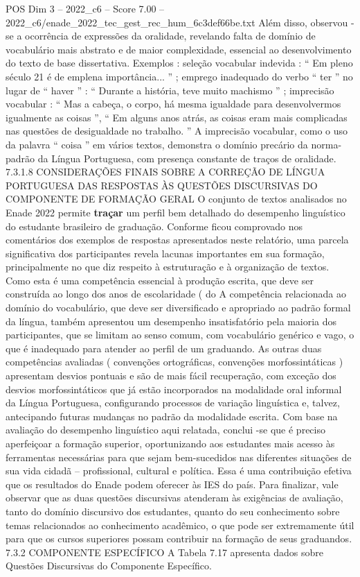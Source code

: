 \begin{textsample}{POS Dim 3 – 2022\_c6 – Score 7.00 – 2022\_c6/enade\_2022\_tec\_gest\_rec\_hum\_6c3def66be.txt}
Além disso, observou -se a ocorrência de expressões da oralidade, revelando falta de domínio de vocabulário mais abstrato e de maior complexidade, essencial ao desenvolvimento do texto de base dissertativa.
Exemplos : seleção vocabular indevida : “ Em pleno século 21 é de emplena importância... ” ; emprego inadequado do verbo “ ter ” no lugar de “ haver ” : “ Durante a história, teve muito machismo ” ; imprecisão vocabular : “ Mas a cabeça, o corpo, há mesma igualdade para desenvolvermos igualmente as coisas ”, “ Em alguns anos atrás, as coisas eram mais complicadas nas questões de desigualdade no trabalho. ” A imprecisão vocabular, como o uso da palavra “ coisa ” em vários textos, demonstra o domínio precário da norma-padrão da Língua Portuguesa, com presença constante de traços de oralidade. 7.3.1.8 CONSIDERAÇÕES FINAIS SOBRE A CORREÇÃO DE LÍNGUA PORTUGUESA DAS RESPOSTAS ÀS QUESTÕES DISCURSIVAS DO COMPONENTE DE FORMAÇÃO GERAL O conjunto de textos analisados no Enade 2022 permite \textbf{traçar} um perfil bem detalhado do desempenho linguístico do estudante brasileiro de graduação.
Conforme ficou comprovado nos comentários dos exemplos de respostas apresentados neste relatório, uma parcela significativa dos participantes revela lacunas importantes em sua formação, principalmente no que diz respeito à estruturação e à organização de textos.
Como esta é uma competência essencial à produção escrita, que deve ser construída ao longo dos anos de escolaridade ( do A competência relacionada ao domínio do vocabulário, que deve ser diversificado e apropriado ao padrão formal da língua, também apresentou um desempenho insatisfatório pela maioria dos participantes, que se limitam ao senso comum, com vocabulário genérico e vago, o que é inadequado para atender ao perfil de um graduando.
As outras duas competências avaliadas ( convenções ortográficas, convenções morfossintáticas ) apresentam desvios pontuais e são de mais fácil recuperação, com exceção dos desvios morfossintáticos que já estão incorporados na modalidade oral informal da Língua Portuguesa, configurando processos de variação linguística e, talvez, antecipando futuras mudanças no padrão da modalidade escrita.
Com base na avaliação do desempenho linguístico aqui relatada, conclui -se que é preciso aperfeiçoar a formação superior, oportunizando aos estudantes mais acesso às ferramentas necessárias para que sejam bem-sucedidos nas diferentes situações de sua vida cidadã – profissional, cultural e política.
Essa é uma contribuição efetiva que os resultados do Enade podem oferecer às IES do país.
Para finalizar, vale observar que as duas questões discursivas atenderam às exigências de avaliação, tanto do domínio discursivo dos estudantes, quanto do seu conhecimento sobre temas relacionados ao conhecimento acadêmico, o que pode ser extremamente útil para que os cursos superiores possam contribuir na formação de seus graduandos. 7.3.2 COMPONENTE ESPECÍFICO A Tabela 7.17 apresenta dados sobre Questões Discursivas do Componente Específico.

\end{textsample}
